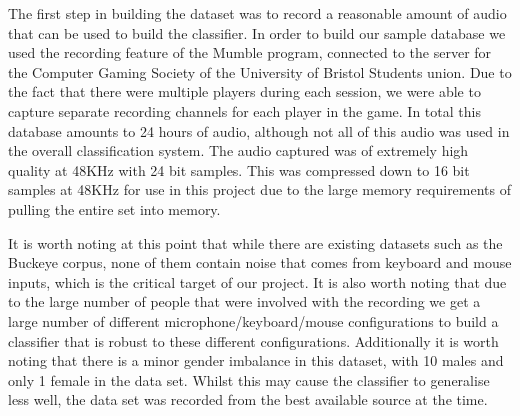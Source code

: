 \documentclass[ %
                    author={Sam Phippen},
                supervisor={Dr. Rafal Bogacz},
                     title={Real time voice activity detectors in noisy personal computing environments},
                  subtitle={},
                    degree={MEng},
                      year={2012} ]{thesis}
\begin{document}
The first step in building the dataset was to record a reasonable amount of
audio that can be used to build the classifier. In order to build our sample
database we used the recording feature of the Mumble\cite{mumble} program,
connected to the server for the Computer Gaming Society of the University of
Bristol Students union. Due to the fact that there were multiple players during
each session, we were able to capture separate recording channels for each
player in the game. In total this database amounts to 24 hours of audio,
although not all of this audio was used in the overall classification system.
The audio captured was of extremely high quality at 48KHz with 24 bit samples.
This was compressed down to 16 bit samples at 48KHz for use in this project due
to the large memory requirements of pulling the entire set into memory. 

It is worth noting at this point that while there are existing datasets such as
the Buckeye corpus\cite{buckeye}, none of them contain noise that comes from
keyboard and mouse inputs, which is the critical target of our project. It is
also worth noting that due to the large number of people that were involved
with the recording we get a large number of different microphone/keyboard/mouse
configurations to build a classifier that is robust to these different
configurations. Additionally it is worth noting that there is a minor gender
imbalance in this dataset, with 10 males and only 1 female in the data set.
Whilst this may cause the classifier to generalise less well, the data set was
recorded from the best available source at the time.
\end{document}

